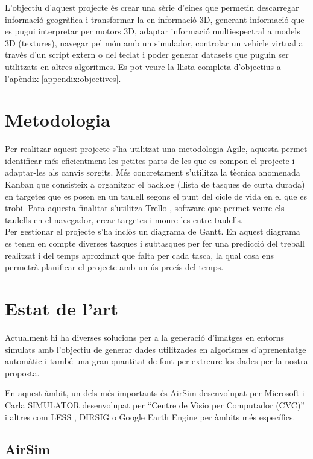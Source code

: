 \documentclass[10pt,a4paper,twocolumn,twoside]{article}
\begin{document}
L'objectiu d'aquest projecte és crear una sèrie d'eines que permetin descarregar informació geogràfica i transformar-la en informació 3D, generant informació que es pugui interpretar per motors 3D, adaptar informació multiespectral a models 3D (textures), navegar pel món amb un simulador, controlar un vehicle virtual a través d'un script extern o del teclat i poder generar datasets que puguin ser utilitzats en altres algoritmes. Es pot veure la llista completa d'objectius a l'apèndix \ref{appendix:objectives}.

\section{Metodologia}
Per realitzar aquest projecte s'ha utilitzat una metodologia Agile, aquesta permet identificar més eficientment les petites parts de les que es compon el projecte i adaptar-les als canvis sorgits. Més concretament s'utilitza la tècnica anomenada Kanban \cite{kanban} que consisteix a organitzar el backlog (llista de tasques de curta durada) en targetes que es posen en un taulell segons el punt del cicle de vida en el que es trobi. Para aquesta finalitat s'utilitza Trello \cite{trello}, software que permet veure els taulells en el navegador, crear targetes i moure-les entre taulells.
\\
Per gestionar el projecte s'ha inclòs un diagrama de Gantt. En aquest diagrama es tenen en compte diverses tasques i subtasques per fer una predicció del treball realitzat i del temps aproximat que falta per cada tasca, la qual cosa ens permetrà planificar el projecte amb un ús precís del temps.

\section{Estat de l'art}
\label{estatart}

Actualment hi ha diverses solucions per a la generació d’imatges en entorns simulats amb l’objectiu de generar dades utilitzades en algorismes d’aprenentatge automàtic i també una gran quantitat de font per extreure les dades per la nostra proposta.

En aquest àmbit, un dels més importants és AirSim \cite{airsim} desenvolupat per Microsoft i Carla SIMULATOR \cite{carla} desenvolupat per ``Centre de Visio per Computador (CVC)'' i altres com LESS \cite{less}, DIRSIG \cite{dirsig} o Google Earth Engine \cite{googleearth} per àmbits més específics.

\subsection{AirSim}
\end{document}
